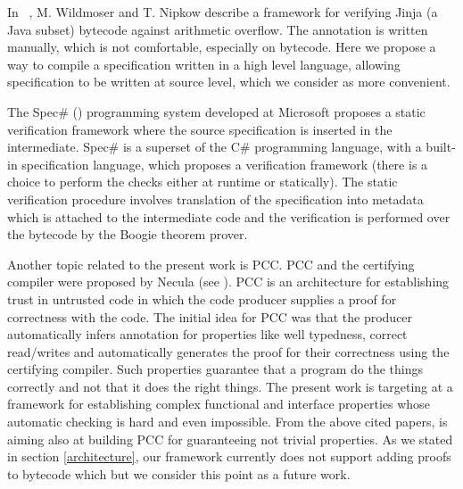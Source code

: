 In ~\cite{WildmoserN-ESOP05}, M. Wildmoser and T. Nipkow describe a framework for verifying Jinja (a Java subset) bytecode 
against arithmetic overflow.  The annotation is written manually, which is not comfortable, especially on bytecode. 
Here we propose a way to compile a specification written in a high level language, allowing specification to be written at source level, which we consider as more convenient.

 The Spec\# (\cite{BLS04sp}) programming system developed at Microsoft proposes a static verification framework where 
 the source specification is inserted in the intermediate. 
 Spec\# is a superset of the C\# programming language, with a built-in  specification language,
which proposes a verification framework (there is a choice to perform the checks either at runtime or statically). 
 The static verification procedure  involves translation of the specification into metadata which is attached to the intermediate code 
 and the verification is performed over the bytecode by the Boogie theorem prover.

Another topic related to the present work is PCC.
 PCC and the certifying compiler were proposed by Necula (see \cite{Necula97,ComNec,DesNecLee98}). PCC is an architecture for establishing trust in untrusted code 
in which the code producer supplies a proof for correctness with the code. 
The initial idea for PCC  was that the producer automatically infers annotation for properties like well typedness, 
correct read/writes and automatically generates the proof for their correctness using the certifying compiler. 
Such properties guarantee that a program do the things correctly and not that it does the right things. The present work is targeting at a
 framework for establishing complex functional and interface properties whose automatic checking is hard and even impossible. 
 From the above cited papers, \cite{BM05plb} is aiming also at building PCC for
 guaranteeing not trivial properties. As we stated in section \ref{architecture}, our framework currently does not support adding proofs to bytecode 
 which but we consider this point as a future work. 
 
